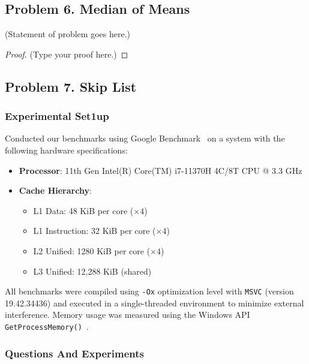 \documentclass[12pt]{article}
\begin{document}
	\vspace{2in} %
	
	
	\subsection*{Problem 6. Median of Means}
	(Statement of problem goes here.)\\
	
	\begin{proof}
		(Type your proof here.)
	\end{proof}
	
	\vspace{2in} %
	
	
	\subsection*{Problem 7. Skip List}
	\vspace{20pt}
	\subsubsection*{Experimental Set1up}
	Conducted our benchmarks using Google Benchmark~\cite{google-bench} on a system with the following hardware specifications:

\begin{itemize}
    \item \textbf{Processor}: 11th Gen Intel(R) Core(TM) i7-11370H 4C/8T CPU @ 3.3 GHz
    \item \textbf{Cache Hierarchy}:
    \begin{itemize}
        \item L1 Data: 48 KiB per core (\(\times 4\))
        \item L1 Instruction: 32 KiB per core (\(\times 4\))
        \item L2 Unified: 1280 KiB per core (\(\times 4\))
        \item L3 Unified: 12,288 KiB (shared)
    \end{itemize}
\end{itemize}

All benchmarks were compiled using \texttt{-Ox} optimization level with \texttt{MSVC} (version 19.42.34436) and executed in a single-threaded environment to minimize external interference. Memory usage was measured using the Windows API \texttt{GetProcessMemory()}~\cite{getprocessmemoryinfo}.\\

\subsubsection*{Questions And Experiments}
	
\end{document}

